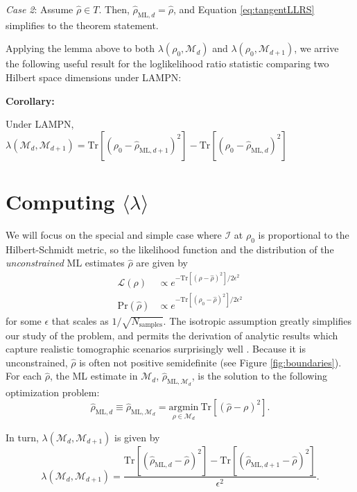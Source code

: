 \documentclass[aps,pra, twocolumn]{revtex4-1}
\newcommand{\M}{\mathcal{M}}
\newcommand{\cL}{\mathcal{L}}
\newcommand{\Fi}{\mathcal{I}}
\newcommand{\rhohat}{\hat{\rho}}
\newcommand{\rhoML}[1]{\rhohat_{\scriptscriptstyle{\mathrm{ML},#1}}}
\begin{document}
\emph{Case 2}: Assume $\hat{\rho} \in T$. Then, $\rhoML{d}= \hat{\rho}$, and Equation \eqref{eq:tangentLLRS} simplifies to the theorem statement.


Applying the lemma above to both $\lambda(\rho_{0},\M_{d})$ and $\lambda(\rho_{0},\M_{d+1})$, we arrive the following useful result for the loglikelihood ratio statistic comparing two Hilbert space dimensions under LAMPN:

\textbf{Corollary:}

Under LAMPN, $\lambda(\M_{d}, \M_{d+1}) = \mathrm{Tr}[(\rho_{0} - \rhoML{d+1})^{2}] -\mathrm{Tr}[(\rho_{0} - \rhoML{d})^{2}]$




\section{Computing $\langle \lambda \rangle$}

We will focus on the special and simple case where $\Fi$ at $\rho_{0}$ is  proportional to the Hilbert-Schmidt metric, so the likelihood function and the distribution of the \emph{unconstrained} ML estimates $\rhohat$ are given by 
\begin{align}
\label{eq:likelihood}
\cL(\rho) & \propto e^{-\mathrm{Tr}[(\rho - \rhohat)^{2}]/2\epsilon^{2}}\\
\mathrm{Pr}(\rhohat) &\propto e^{-\mathrm{Tr}[(\rho_{0} - \rhohat)^{2}]/2\epsilon^{2}}
\end{align}
for some $\epsilon$ that scales as $1 / \sqrt{N_{\mathrm{samples}}}$.  The isotropic assumption greatly simplifies our study of the problem, and permits the derivation of analytic results which capture realistic tomographic scenarios surprisingly well \cite{Smolin2012}. 
Because it is unconstrained, $\rhohat$ is often not positive semidefinite (see Figure \ref{fig:boundaries}). For each $\rhohat$, the ML estimate in $\M_{d}$, $\rhoML{\M_{d}}$, is the solution to the following optimization problem:
\begin{equation}
\label{eq:mleopt}
\rhoML{d} \equiv \rhoML{\M_{d}} = \underset{\rho \in \M_{d}}{\mathrm{argmin}}~\mathrm{Tr}[(\rhohat - \rho)^{2}].
\end{equation}

In turn, $\lambda(\M_{d}, \M_{d+1})$ is given by
\begin{equation}
\label{eq:llrs}
\lambda(\M_{d}, \M_{d+1}) = \frac{\mathrm{Tr}[(\rhoML{d}  - \rhohat)^{2}] - \mathrm{Tr}[(\rhoML{d+1} - \rhohat)^{2}]}{\epsilon^{2}}.
\end{equation}
\end{document}
